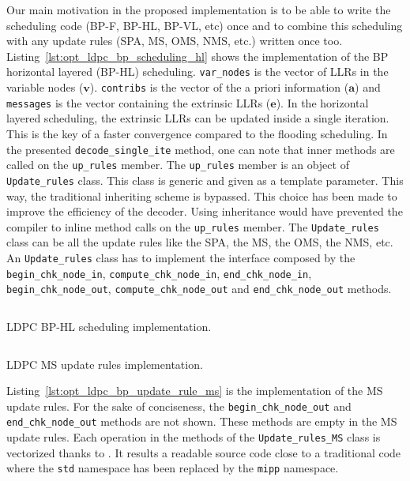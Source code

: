 Our main motivation in the proposed implementation is to be able to write the
scheduling code (BP-F, BP-HL, BP-VL, etc) once and to combine this scheduling
with any update rules (SPA, MS, OMS, NMS, etc.) written once too.
Listing~\ref{lst:opt_ldpc_bp_scheduling_hl} shows the implementation of the
BP horizontal layered (BP-HL) scheduling. \verb|var_nodes| is the vector of
LLRs in the variable nodes ($\bm{v}$). \verb|contribs| is the vector of the a
priori information ($\bm{a}$) and \verb|messages| is the vector containing the
extrinsic LLRs ($\bm{e}$). In the horizontal layered scheduling, the
extrinsic LLRs can be updated inside a single iteration. This is the key of a
faster convergence compared to the flooding scheduling. In the presented
\verb|decode_single_ite| method, one can note that inner methods are called on
the \verb|up_rules| member. The \verb|up_rules| member is an object of
\verb|Update_rules| class. This class is generic and given as a template
parameter. This way, the traditional inheriting scheme is bypassed. This choice
has been made to improve the efficiency of the decoder. Using inheritance would
have prevented the compiler to inline method calls on the \verb|up_rules|
member. The \verb|Update_rules| class can be all the update rules like the SPA,
the MS, the OMS, the NMS, etc. An \verb|Update_rules| class has to implement the
interface composed by the \verb|begin_chk_node_in|, \verb|compute_chk_node_in|,
\verb|end_chk_node_in|, \verb|begin_chk_node_out|, \verb|compute_chk_node_out|
and \verb|end_chk_node_out| methods.

\begin{listing}[htp]
  \inputminted[frame=lines,linenos]{C++}{\curChapter/src/ldpc/bp_scheduling_hl.cpp}
  \caption{LDPC BP-HL scheduling implementation.}
  \label{lst:opt_ldpc_bp_scheduling_hl}
\end{listing}

\begin{listing}[htp]
  \inputminted[frame=lines,linenos]{C++}{\curChapter/src/ldpc/bp_update_rule_ms.cpp}
  \caption{LDPC MS update rules implementation.}
  \label{lst:opt_ldpc_bp_update_rule_ms}
\end{listing}

Listing~\ref{lst:opt_ldpc_bp_update_rule_ms} is the implementation of the MS
update rules. For the sake of conciseness, the \verb|begin_chk_node_out| and
\verb|end_chk_node_out| methods are not shown. These methods are empty in the
MS update rules. Each operation in the methods of the \verb|Update_rules_MS|
class is vectorized thanks to \MIPP. It results a readable source code close to
a traditional \Cxx code where the \verb|std| namespace has been replaced by the
\verb|mipp| namespace.

